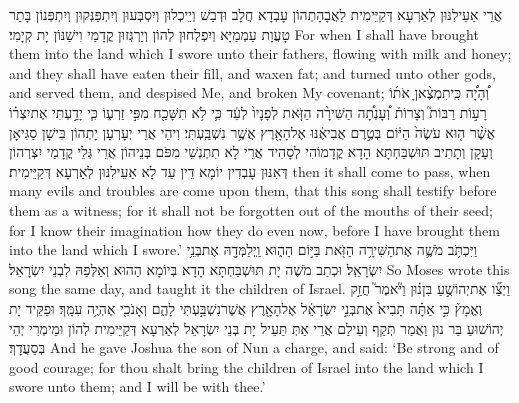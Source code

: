 {אֲרֵי אַעֵילִנּוּן לְאַרְעָא דְּקַיֵּימִית לַאֲבָהָתְהוֹן עָבְדָא חֲלָב וּדְבַשׁ וְיֵיכְלוּן וְיִסְבְּעוּן וְיִתְפַּנְּקוּן וְיִתְפְּנוֹן בָּתַר טָעֲוָת עַמְמַיָּא וְיִפְלְחוּן לְהוֹן וְיַרְגְּזוּן קֳדָמַי וִישַׁנּוֹן יָת קְיָמִי׃}
{For when I shall have brought them into the land which I swore unto their fathers, flowing with milk and honey; and they shall have eaten their fill, and waxen fat; and turned unto other gods, and served them, and despised Me, and broken My covenant;}{}
{וְ֠הָיָ֠ה כִּֽי\maqqaf תִמְצֶ֨אןָ אֹת֜וֹ רָע֣וֹת רַבּוֹת֮ וְצָרוֹת֒ וְ֠עָנְתָ֠ה הַשִּׁירָ֨ה הַזֹּ֤את לְפָנָיו֙ לְעֵ֔ד כִּ֛י לֹ֥א תִשָּׁכַ֖ח מִפִּ֣י זַרְע֑וֹ כִּ֧י יָדַ֣עְתִּי אֶת\maqqaf יִצְר֗וֹ אֲשֶׁ֨ר ה֤וּא עֹשֶׂה֙ הַיּ֔וֹם בְּטֶ֣רֶם אֲבִיאֶ֔נּוּ אֶל\maqqaf הָאָ֖רֶץ אֲשֶׁ֥ר נִשְׁבַּֽעְתִּי׃}
{וִיהֵי אֲרֵי יְעָרְעָן יָתְהוֹן בִּישָׁן סַגִּיאָן וְעָקָן וְתָתִיב תּוּשְׁבַּחְתָּא הָדָא קֳדָמוֹהִי לְסָהִיד אֲרֵי לָא תִתְנְשֵׁי מִפֹּם בְּנֵיהוֹן אֲרֵי גְּלֵי קֳדָמַי יִצְרְהוֹן דְּאִנּוּן עָבְדִין יוֹמָא דֵין עַד לָא אַעֵילִנּוּן לְאַרְעָא דְּקַיֵּימִית׃}
{then it shall come to pass, when many evils and troubles are come upon them, that this song shall testify before them as a witness; for it shall not be forgotten out of the mouths of their seed; for I know their imagination how they do even now, before I have brought them into the land which I swore.’}{}
{וַיִּכְתֹּ֥ב מֹשֶׁ֛ה אֶת\maqqaf הַשִּׁירָ֥ה הַזֹּ֖את בַּיּ֣וֹם הַה֑וּא וַֽיְלַמְּדָ֖הּ אֶת\maqqaf בְּנֵ֥י יִשְׂרָאֵֽל׃}
{וּכְתַב מֹשֶׁה יָת תּוּשְׁבַּחְתָּא הָדָא בְּיוֹמָא הַהוּא וְאַלְּפַהּ לִבְנֵי יִשְׂרָאֵל׃}
{So Moses wrote this song the same day, and taught it the children of Israel.}{}
{וַיְצַ֞ו אֶת\maqqaf יְהוֹשֻׁ֣עַ בִּן\maqqaf נ֗וּן וַיֹּ֘אמֶר֮ חֲזַ֣ק וֶאֱמָץ֒ כִּ֣י אַתָּ֗ה תָּבִיא֙ אֶת\maqqaf בְּנֵ֣י יִשְׂרָאֵ֔ל אֶל\maqqaf הָאָ֖רֶץ אֲשֶׁר\maqqaf נִשְׁבַּ֣עְתִּי לָהֶ֑ם וְאָנֹכִ֖י אֶהְיֶ֥ה עִמָּֽךְ׃}
{וּפַקֵּיד יָת יְהוֹשׁוּעַ בַּר נוּן וַאֲמַר תְּקַף וְעֵילַם אֲרֵי אַתְּ תַּעֵיל יָת בְּנֵי יִשְׂרָאֵל לְאַרְעָא דְּקַיֵּימִית לְהוֹן וּמֵימְרִי יְהֵי בְּסַעֲדָךְ׃}
{And he gave Joshua the son of Nun a charge, and said: ‘Be strong and of good courage; for thou shalt bring the children of Israel into the land which I swore unto them; and I will be with thee.’}{}

